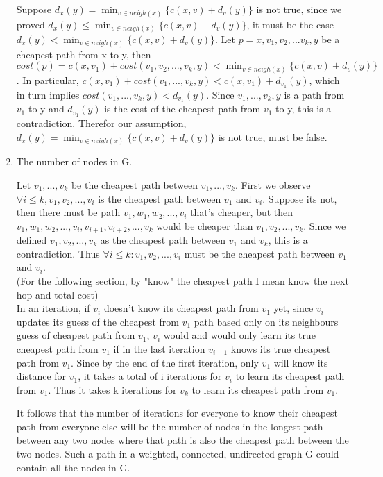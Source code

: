 \documentclass[12pt]{article}
\begin{document}
\begin{enumerate}
        Suppose $d_x(y) = \min_{v \in neigh(x)}\{c(x,v) + d_v(y)\}$ is not true, since we proved
        $d_x(y) \leq \min_{v \in neigh(x)}\{c(x,v) + d_v(y)\}$, it must be the case 
        $d_x(y) < \min_{v \in neigh(x)}\{c(x,v) + d_v(y)\}$.
        Let $p=x,v_1,v_2,...v_k,y$ be a cheapest path from x to y, then  
        $cost(p) = c(x,v_1) + cost(v_1, v_2,...,v_k,y) < \min_{v \in neigh(x)}\{c(x,v) + d_v(y)\}$. 
        In particular, $c(x, v_1) + cost(v_1,...,v_k,y) < c(x, v_1) + d_{v_1}(y)$,
        which in turn implies $cost(v_1,...,v_k,y) < d_{v_1}(y)$.
        Since $v_1,...,v_k,y$ is a path from $v_1$ to y and $d_{v_1}(y)$ is the cost of the cheapest path from 
        $v_1$ to y, this is a contradiction. Therefor our assumption, $d_x(y) = \min_{v \in neigh(x)}\{c(x,v) + d_v(y)\}$ is not true,
        must be false.

	\item %

        The number of nodes in G.

        Let $v_1,...,v_k$ be the cheapest path between $v_1,...,v_k$.  First we observe
        $\forall i \leq k, v_1, v_2, ..., v_i$ is the cheapest path between $v_1$ and $v_i$.
        Suppose its not, then there must be path $v_1,w_1,w_2,...,v_i$ that's cheaper, but then
        $v_1,w_1,w_2,...,v_i,v_{i+1},v_{i+2},...,v_k$ would be cheaper than $v_1,v_2,...,v_k$.
        Since we defined $v_1,v_2,...,v_k$ as the cheapest path between $v_1$ and $v_k$, this is a
        contradiction. Thus $\forall i \leq k: v_1, v_2, ..., v_i$ must be the cheapest path between $v_1$ and $v_i$. \\

        (For the following section, by "know" the cheapest path I mean know the next hop and total cost) \\

        In an iteration, if $v_i$ doesn't know its cheapest path from $v_1$ yet, since $v_i$ updates its guess of the cheapest
        from $v_1$ path based only on its neighbours guess of cheapest path from $v_1$,
        $v_i$ would and would only learn its true cheapest path from $v_1$ if in the last 
        iteration $v_{i-1}$ knows its true cheapest path from $v_1$. Since by the end of the first iteration, only
        $v_1$ will know its distance for $v_1$, it takes a total of i iterations for $v_i$ to learn
        its cheapest path from $v_1$. Thus it takes k iterations for $v_k$ to learn its cheapest path
        from $v_1$.

        It follows that the number of iterations for everyone to know their cheapest path from everyone else 
        will be the number of nodes in the longest path between any two nodes where that path is also the 
        cheapest path between the two nodes. Such a path in a weighted, connected, undirected graph G
        could contain all the nodes in G.





\end{enumerate}
\end{document}

